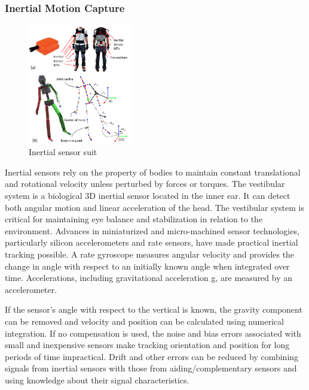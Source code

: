 \subsubsection*{Inertial Motion Capture}
\begin{figure}[h]
	\centering
	\includegraphics[width=0.4\textwidth]{figures/Inertial.png}
	\caption{Inertial sensor suit}
\end{figure}

Inertial sensors \cite{Kalman Filtering for Sensor Fusionin a Human Tracking System} rely on the property of bodies to maintain constant translational and rotational velocity unless perturbed by forces or torques. The vestibular system is a biological 3D inertial sensor located in the inner ear. It can detect both angular motion and linear acceleration of the head. The vestibular system is critical for maintaining eye balance and stabilization in relation to the environment. Advances in miniaturized and micro-machined sensor technologies, particularly silicon accelerometers and rate sensors, have made practical inertial tracking possible. A rate gyroscope measures angular velocity and provides the change in angle with respect to an initially known angle when integrated over time. Accelerations, including gravitational acceleration g, are measured by an accelerometer.

If the sensor's angle with respect to the vertical is known, the gravity component can be removed and velocity and position can be calculated using numerical integration. If no compensation is used, the noise and bias errors associated with small and inexpensive sensors make tracking orientation and position for long periods of time impractical. Drift and other errors can be reduced by combining signals from inertial sensors with those from aiding/complementary sensors and using knowledge about their signal characteristics.

\pagebreak

